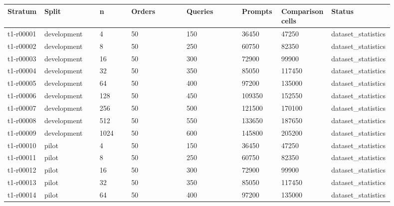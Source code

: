 \begingroup
\small
\setlength{\tabcolsep}{2pt}
\begin{longtable}{@{}p{0.09\linewidth}p{0.14\linewidth}p{0.08\linewidth}p{0.14\linewidth}p{0.14\linewidth}p{0.1\linewidth}p{0.1\linewidth}p{0.11\linewidth}@{}}
\hline
Stratum & Split & n & Orders & Queries & Prompts & Comparison cells & Status \\
\hline
t1-r00001 & development & 4 & 50 & 150 & 36450 & 47250 & dataset\_\allowbreak{}statistics \\
t1-r00002 & development & 8 & 50 & 250 & 60750 & 82350 & dataset\_\allowbreak{}statistics \\
t1-r00003 & development & 16 & 50 & 300 & 72900 & 99900 & dataset\_\allowbreak{}statistics \\
t1-r00004 & development & 32 & 50 & 350 & 85050 & 117450 & dataset\_\allowbreak{}statistics \\
t1-r00005 & development & 64 & 50 & 400 & 97200 & 135000 & dataset\_\allowbreak{}statistics \\
t1-r00006 & development & 128 & 50 & 450 & 109350 & 152550 & dataset\_\allowbreak{}statistics \\
t1-r00007 & development & 256 & 50 & 500 & 121500 & 170100 & dataset\_\allowbreak{}statistics \\
t1-r00008 & development & 512 & 50 & 550 & 133650 & 187650 & dataset\_\allowbreak{}statistics \\
t1-r00009 & development & 1024 & 50 & 600 & 145800 & 205200 & dataset\_\allowbreak{}statistics \\
t1-r00010 & pilot & 4 & 50 & 150 & 36450 & 47250 & dataset\_\allowbreak{}statistics \\
t1-r00011 & pilot & 8 & 50 & 250 & 60750 & 82350 & dataset\_\allowbreak{}statistics \\
t1-r00012 & pilot & 16 & 50 & 300 & 72900 & 99900 & dataset\_\allowbreak{}statistics \\
t1-r00013 & pilot & 32 & 50 & 350 & 85050 & 117450 & dataset\_\allowbreak{}statistics \\
t1-r00014 & pilot & 64 & 50 & 400 & 97200 & 135000 & dataset\_\allowbreak{}statistics \\

\end{longtable}
